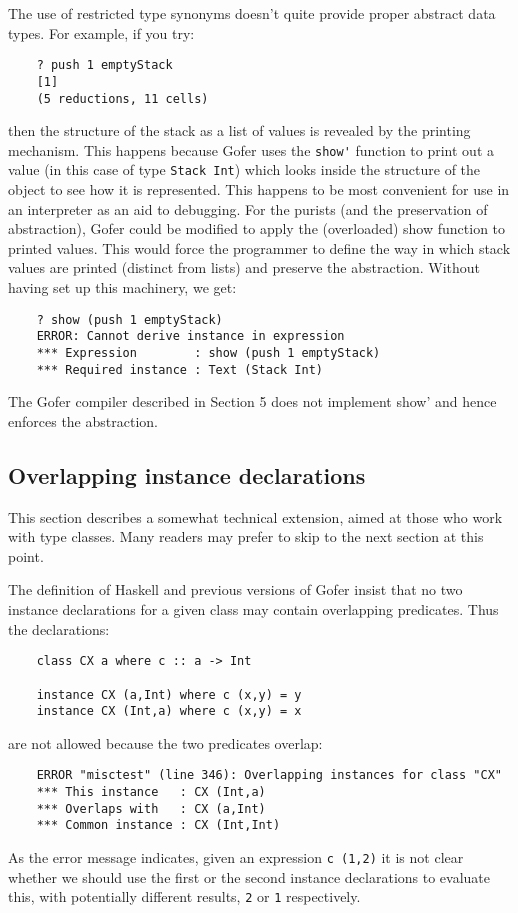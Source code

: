 The use of restricted type synonyms doesn't quite provide proper
abstract data types.  For example, if you try:
\begin{verbatim}
    ? push 1 emptyStack
    [1]
    (5 reductions, 11 cells)
\end{verbatim}
then the structure of the stack as a list of values is revealed by the
printing mechanism.  This happens because Gofer uses the \verb"show'" function
to print out a value (in this case of type \verb"Stack Int") which looks inside
the structure of the object to see how it is represented.  This happens
to be most convenient for use in an interpreter as an aid to debugging.
For the purists (and the preservation of abstraction), Gofer could be
modified to apply the (overloaded) show function to printed values.
This would force the programmer to define the way in which stack values
are printed (distinct from lists) and preserve the abstraction.  Without
having set up this machinery, we get:
\begin{verbatim}
    ? show (push 1 emptyStack)
    ERROR: Cannot derive instance in expression
    *** Expression        : show (push 1 emptyStack)
    *** Required instance : Text (Stack Int)
\end{verbatim}
The Gofer compiler described in Section 5 does not implement show' and
hence enforces the abstraction.


\subsection{Overlapping instance declarations}
This section describes a somewhat technical extension, aimed at those
who work with type classes.  Many readers may prefer to skip to the
next section at this point.

The definition of Haskell and previous versions of Gofer insist that no
two instance declarations for a given class may contain overlapping
predicates.  Thus the declarations:
\begin{verbatim}
    class CX a where c :: a -> Int

    instance CX (a,Int) where c (x,y) = y
    instance CX (Int,a) where c (x,y) = x
\end{verbatim}
are not allowed because the two predicates overlap:
\begin{verbatim}
    ERROR "misctest" (line 346): Overlapping instances for class "CX"
    *** This instance   : CX (Int,a)
    *** Overlaps with   : CX (a,Int)
    *** Common instance : CX (Int,Int)
\end{verbatim}
As the error message indicates, given an expression \verb"c (1,2)" it is not
clear whether we should use the first or the second instance
declarations to evaluate this, with potentially different results, \verb"2" or
\verb"1" respectively.

